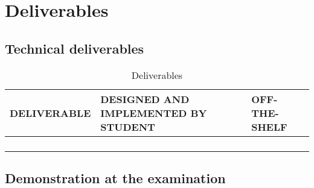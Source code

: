 
\section{Deliverables}

\subsection{Technical deliverables}

\begin{center}
\begin{longtable}{|p{7cm}|p{3.5cm}|p{3.5cm}|}
\hline
\textbf{DELIVERABLE} & \textbf{DESIGNED AND IMPLEMENTED BY STUDENT} &
\textbf{OFF-THE-SHELF} \\
\hline
         &     &  \\
\hline
         &     &  \\
\hline
         &     &  \\
\hline
\caption{Deliverables}
\end{longtable}
\end{center}

\subsection{Demonstration at the examination}

\newpage



